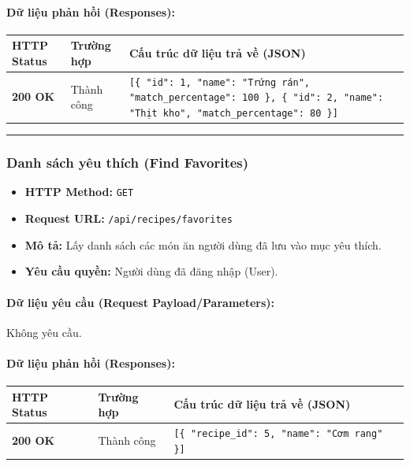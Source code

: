 \documentclass[12pt,a4paper]{article}
\begin{document}
\paragraph{Dữ liệu phản hồi (Responses):}
\begin{longtable}{|p{2.8cm}|p{3.2cm}|p{8.0cm}|}
\hline
\textbf{HTTP Status} & \textbf{Trường hợp} & \textbf{Cấu trúc dữ liệu trả về (JSON)} \\ \hline
\endhead
\textbf{200 OK} & Thành công & \texttt{[\{ "id": 1, "name": "Trứng rán", "match\_percentage": 100 \}, \{ "id": 2, "name": "Thịt kho", "match\_percentage": 80 \}]} \\ \hline
\end{longtable}

\vskip 0.4cm
\noindent\rule{\textwidth}{0.3pt}
\vskip 0.4cm

\subsubsection{Danh sách yêu thích (Find Favorites)}
\begin{itemize}[leftmargin=*]
    \item \textbf{HTTP Method:} \texttt{GET}
    \item \textbf{Request URL:} \texttt{/api/recipes/favorites}
    \item \textbf{Mô tả:} Lấy danh sách các món ăn người dùng đã lưu vào mục yêu thích.
    \item \textbf{Yêu cầu quyền:} Người dùng đã đăng nhập (User).
\end{itemize}

\paragraph{Dữ liệu yêu cầu (Request Payload/Parameters):}
Không yêu cầu.\\

\paragraph{Dữ liệu phản hồi (Responses):}
\begin{longtable}{|p{2.8cm}|p{3.2cm}|p{8.0cm}|}
\hline
\textbf{HTTP Status} & \textbf{Trường hợp} & \textbf{Cấu trúc dữ liệu trả về (JSON)} \\ \hline
\endhead
\textbf{200 OK} & Thành công & \texttt{[\{ "recipe\_id": 5, "name": "Cơm rang" \}]} \\ \hline
\end{longtable}
\end{document}
